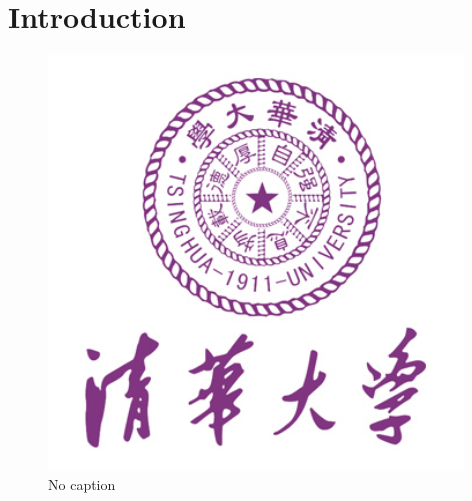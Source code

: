 




\tableofcontents
\clearpage

\begin{abstract}

\end{abstract}
\section{Introduction}



\begin{figure}[htbp]
\centering
\includegraphics[width=11cm]{resources/logo.jpg}
\caption{No caption}
\label{fig:fullarm}
\end{figure}


